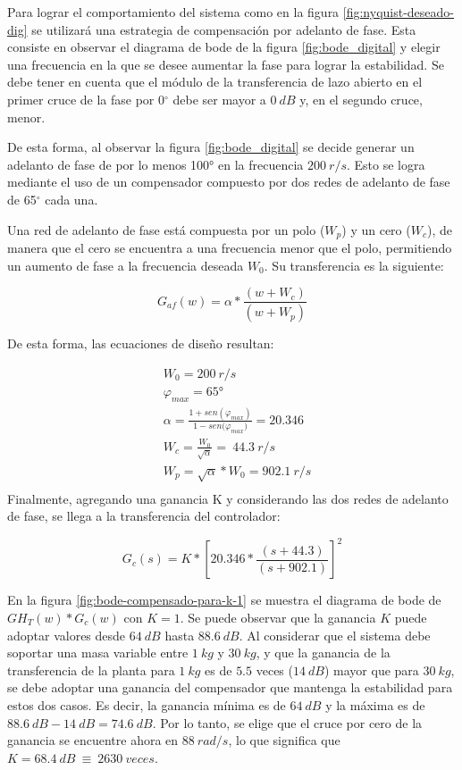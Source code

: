 Para lograr el comportamiento del sistema como en la figura 	\ref{fig:nyquist-deseado-dig} se utilizará una estrategia de compensación por adelanto de fase. Esta consiste en observar el diagrama de bode de la figura \ref{fig:bode_digital} y elegir una frecuencia en la que se desee aumentar la fase para lograr la estabilidad. Se debe tener en cuenta que el módulo de la transferencia de lazo abierto en el primer cruce de la fase por 0$\mathrm{{}^\circ}$ debe ser mayor a $0\:dB$ y, en el segundo cruce, menor. 

De esta forma, al observar la figura \ref{fig:bode_digital} se decide generar un adelanto de fase de por lo menos 100° en la frecuencia $200\:r/s$. Esto se logra mediante el uso de un compensador compuesto por dos redes de adelanto de fase de 65$\mathrm{{}^\circ}$ cada una. 

Una red de adelanto de fase está compuesta por un polo ($W_p$) y un cero ($W_c$), de manera que el cero se encuentra a una frecuencia menor que el polo, permitiendo un aumento de fase a la frecuencia deseada $W_0$. Su transferencia es la siguiente:

\begin{equation} \label{eq_tf_adelanto_dig}
	G_{af}(w)=\alpha*\frac{(w + W_c)}{(w + W_p)}
\end{equation}

\noindent De esta forma, las ecuaciones de diseño resultan:

\begin{equation*}
	\begin{aligned}
		&W_0 =200\:r/s\\
		&{\varphi }_{max} =65\textrm{°}\\
		&\alpha =\frac{1+sen({\varphi }_{max})}{1-sen{(\varphi }_{max})}=20.346\\
		&W_c =\frac{W_0}{\sqrt{\alpha }}=\ 44.3\:r/s\\
		&W_p =\sqrt{\alpha }*W_0=902.1\: r/s\\
	\end{aligned}
\end{equation*} 
\noindent Finalmente, agregando una ganancia K y considerando las dos redes de adelanto de fase, se llega a la transferencia del controlador:

\begin{equation}  
	G_c(s)=K*{[20.346*\frac{(s+44.3)}{(s+902.1)}]}^2
	\label{eq:transferencia-del-compensador}
\end{equation} 

En la figura \ref{fig:bode-compensado-para-k-1} se muestra el diagrama de bode de ${GH}_T(w)*G_c(w)$ con $K=1$. Se puede observar que la ganancia $K$ puede adoptar valores desde $64\:dB$ hasta $88.6\:dB$. Al considerar que el sistema debe soportar una masa variable entre $1\:kg$ y $30\:kg$, y que la ganancia de la transferencia de la planta para $1\:kg$ es de $5.5$ veces ($14\:dB$) mayor que para $30\:kg$, se debe adoptar una ganancia del compensador que mantenga la estabilidad para estos dos casos. Es decir, la ganancia m\'{i}nima es de $64\:dB$ y la m\'{a}xima es de $88.6\:dB - 14\:dB = 74.6\:dB$. Por lo tanto, se elige que el cruce por cero de la ganancia se encuentre ahora en $88\:rad/s$, lo que significa que $K=68.4\:dB\ \equiv \ 2630\:veces$.

